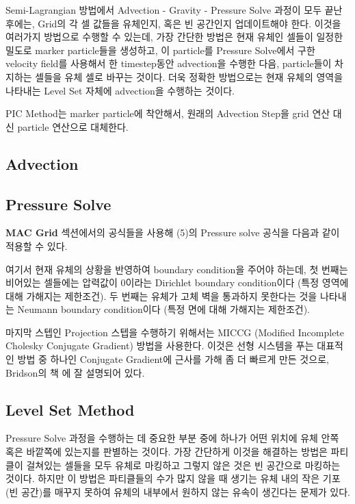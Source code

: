 \documentclass[10pt, A4]{article}
\begin{document}
Semi-Lagrangian 방법에서 Advection - Gravity - Pressure Solve 과정이 모두 끝난 후에는, Grid의 각 셀 값들을 유체인지, 혹은 빈 공간인지 업데이트해야 한다. 이것을 여러가지 방법으로 수행할 수 있는데, 가장 간단한 방법은 현재 유체인 셀들이 일정한 밀도로 marker particle들을 생성하고, 이 particle를 Pressure Solve에서 구한 velocity field를 사용해서 한 timestep동안 advection을 수행한 다음, particle들이 차지하는 셀들을 유체 셀로 바꾸는 것이다. 더욱 정확한 방법으로는 현재 유체의 영역을 나타내는 Level Set 자체에 advection을 수행하는 것이다. 

PIC Method는 marker particle에 착안해서, 원래의 Advection Step을 grid 연산 대신 particle 연산으로 대체한다. 

\subsection{Advection}

\subsection{Pressure Solve}

\textbf{MAC Grid} 섹션에서의 공식들을 사용해 (5)의 Pressure solve 공식을 다음과 같이 적용할 수 있다.

여기서 현재 유체의 상황을 반영하여 boundary condition을 주어야 하는데, 첫 번째는 비어있는 셀들에는 압력값이 0이라는 Dirichlet boundary condition이다 (특정 영역에 대해 가해지는 제한조건). 두 번째는 유체가 고체 벽을 통과하지 못한다는 것을 나타내는 Neumann boundary condition이다 (특정 면에 대해 가해지는 제한조건).

마지막 스텝인 Projection 스텝을 수행하기 위해서는 MICCG (Modified Incomplete Cholesky Conjugate Gradient) 방법을 사용한다. 이것은 선형 시스템을 푸는 대표적인 방법 중 하나인 Conjugate Gradient에 근사를 가해 좀 더 빠르게 만든 것으로, Bridson의 책 \cite[p.79]{fluid-sim-cg}에 잘 설명되어 있다.

\subsection{Level Set Method}

Pressure Solve 과정을 수행하는 데 중요한 부분 중에 하나가 어떤 위치에 유체 안쪽 혹은 바깥쪽에 있는지를 판별하는 것이다. 가장 간단하게 이것을 해결하는 방법은 파티클이 걸쳐있는 셀들을 모두 유체로 마킹하고 그렇지 않은 것은 빈 공간으로 마킹하는 것이다. 하지만 이 방법은 파티클들의 수가 많지 않을 때 생기는 유체 내의 작은 기포 (빈 공간)를 매꾸지 못하여 유체의 내부에서 원하지 않는 유속이 생긴다는 문제가 있다.
\end{document}
